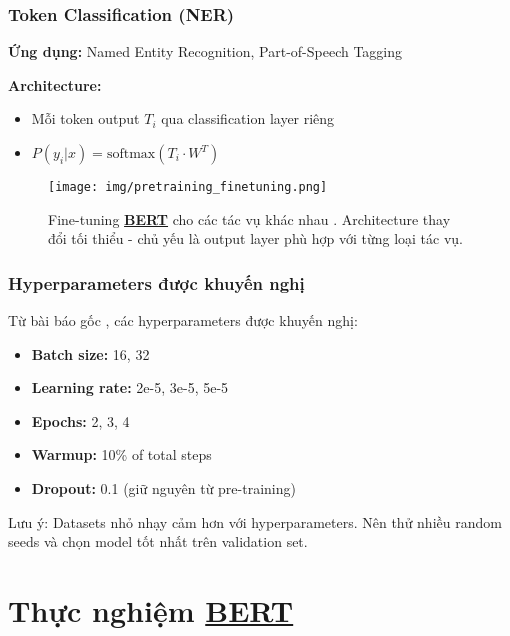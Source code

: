     \subsubsection{Token Classification (NER)}
    \textbf{Ứng dụng:} Named Entity Recognition, Part-of-Speech Tagging
    
    \textbf{Architecture:}
    \begin{itemize}
        \item Mỗi token output $T_i$ qua classification layer riêng
        \item $P(y_i|x) = \text{softmax}(T_i \cdot W^T)$
    \end{itemize}
    
    \begin{figure}[H]
        \centering
        \texttt{[image: img/pretraining\_finetuning.png]}
        \caption{Fine-tuning \hyperref[acro:bert]{\textbf{BERT}} cho các tác vụ khác nhau \cite{devlin2018bert}. Architecture thay đổi tối thiểu - chủ yếu là output layer phù hợp với từng loại tác vụ.}
        \label{fig:bert_finetuning_tasks}
    \end{figure}
    
    \subsubsection{Hyperparameters được khuyến nghị}
    Từ bài báo gốc \cite{devlin2018bert}, các hyperparameters được khuyến nghị:
    \begin{itemize}
        \item \textbf{Batch size:} 16, 32
        \item \textbf{Learning rate:} 2e-5, 3e-5, 5e-5 
        \item \textbf{Epochs:} 2, 3, 4
        \item \textbf{Warmup:} 10\% of total steps
        \item \textbf{Dropout:} 0.1 (giữ nguyên từ pre-training)
    \end{itemize}
    
    Lưu ý: Datasets nhỏ nhạy cảm hơn với hyperparameters. Nên thử nhiều random seeds và chọn model tốt nhất trên validation set.
    
    \section{Thực nghiệm \hyperref[acro:bert]{\textbf{BERT}}}
    \label{sec:thuc_nghiem_bert}
    
